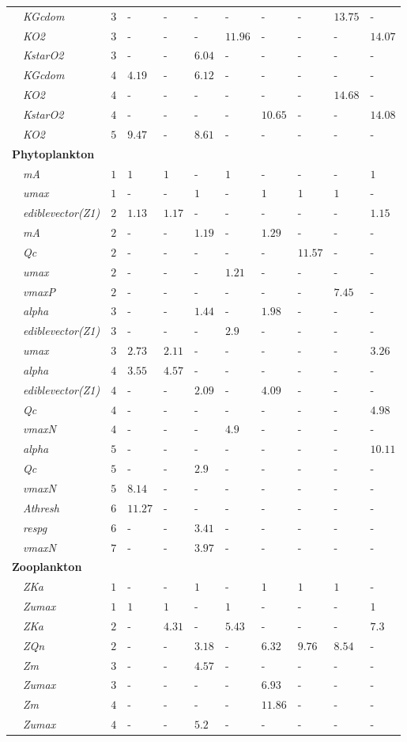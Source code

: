 \documentclass[letterpaper,12pt,oneside]{article}\usepackage[]{graphicx}\usepackage[]{color}
\begin{document}
\begin{table}[!tbp]
{\begin{center}
\begin{tabular}{lrllllllll}
~~\scriptsize{\textit{KGcdom}}&$3$&-&-&-&-&-&-&$13.75$&-\tabularnewline
~~\scriptsize{\textit{KO2}}&$3$&-&-&-&$11.96$&-&-&-&$14.07$\tabularnewline
~~\scriptsize{\textit{KstarO2}}&$3$&-&-&$6.04$&-&-&-&-&-\tabularnewline
~~\scriptsize{\textit{KGcdom}}&$4$&$4.19$&-&$6.12$&-&-&-&-&-\tabularnewline
~~\scriptsize{\textit{KO2}}&$4$&-&-&-&-&-&-&$14.68$&-\tabularnewline
~~\scriptsize{\textit{KstarO2}}&$4$&-&-&-&-&$10.65$&-&-&$14.08$\tabularnewline
~~\scriptsize{\textit{KO2}}&$5$&$9.47$&-&$8.61$&-&-&-&-&-\tabularnewline
\hline
{\bfseries Phytoplankton}&&&&&&&&&\tabularnewline
~~\scriptsize{\textit{mA}}&$1$&$1$&$1$&-&$1$&-&-&-&$1$\tabularnewline
~~\scriptsize{\textit{umax}}&$1$&-&-&$1$&-&$1$&$1$&$1$&-\tabularnewline
~~\scriptsize{\textit{ediblevector(Z1)}}&$2$&$1.13$&$1.17$&-&-&-&-&-&$1.15$\tabularnewline
~~\scriptsize{\textit{mA}}&$2$&-&-&$1.19$&-&$1.29$&-&-&-\tabularnewline
~~\scriptsize{\textit{Qc}}&$2$&-&-&-&-&-&$11.57$&-&-\tabularnewline
~~\scriptsize{\textit{umax}}&$2$&-&-&-&$1.21$&-&-&-&-\tabularnewline
~~\scriptsize{\textit{vmaxP}}&$2$&-&-&-&-&-&-&$7.45$&-\tabularnewline
~~\scriptsize{\textit{alpha}}&$3$&-&-&$1.44$&-&$1.98$&-&-&-\tabularnewline
~~\scriptsize{\textit{ediblevector(Z1)}}&$3$&-&-&-&$2.9$&-&-&-&-\tabularnewline
~~\scriptsize{\textit{umax}}&$3$&$2.73$&$2.11$&-&-&-&-&-&$3.26$\tabularnewline
~~\scriptsize{\textit{alpha}}&$4$&$3.55$&$4.57$&-&-&-&-&-&-\tabularnewline
~~\scriptsize{\textit{ediblevector(Z1)}}&$4$&-&-&$2.09$&-&$4.09$&-&-&-\tabularnewline
~~\scriptsize{\textit{Qc}}&$4$&-&-&-&-&-&-&-&$4.98$\tabularnewline
~~\scriptsize{\textit{vmaxN}}&$4$&-&-&-&$4.9$&-&-&-&-\tabularnewline
~~\scriptsize{\textit{alpha}}&$5$&-&-&-&-&-&-&-&$10.11$\tabularnewline
~~\scriptsize{\textit{Qc}}&$5$&-&-&$2.9$&-&-&-&-&-\tabularnewline
~~\scriptsize{\textit{vmaxN}}&$5$&$8.14$&-&-&-&-&-&-&-\tabularnewline
~~\scriptsize{\textit{Athresh}}&$6$&$11.27$&-&-&-&-&-&-&-\tabularnewline
~~\scriptsize{\textit{respg}}&$6$&-&-&$3.41$&-&-&-&-&-\tabularnewline
~~\scriptsize{\textit{vmaxN}}&$7$&-&-&$3.97$&-&-&-&-&-\tabularnewline
\hline
{\bfseries Zooplankton}&&&&&&&&&\tabularnewline
~~\scriptsize{\textit{ZKa}}&$1$&-&-&$1$&-&$1$&$1$&$1$&-\tabularnewline
~~\scriptsize{\textit{Zumax}}&$1$&$1$&$1$&-&$1$&-&-&-&$1$\tabularnewline
~~\scriptsize{\textit{ZKa}}&$2$&-&$4.31$&-&$5.43$&-&-&-&$7.3$\tabularnewline
~~\scriptsize{\textit{ZQn}}&$2$&-&-&$3.18$&-&$6.32$&$9.76$&$8.54$&-\tabularnewline
~~\scriptsize{\textit{Zm}}&$3$&-&-&$4.57$&-&-&-&-&-\tabularnewline
~~\scriptsize{\textit{Zumax}}&$3$&-&-&-&-&$6.93$&-&-&-\tabularnewline
~~\scriptsize{\textit{Zm}}&$4$&-&-&-&-&$11.86$&-&-&-\tabularnewline
~~\scriptsize{\textit{Zumax}}&$4$&-&-&$5.2$&-&-&-&-&-\tabularnewline
\hline
\end{tabular}\end{center}}

\end{table}
\end{document}
